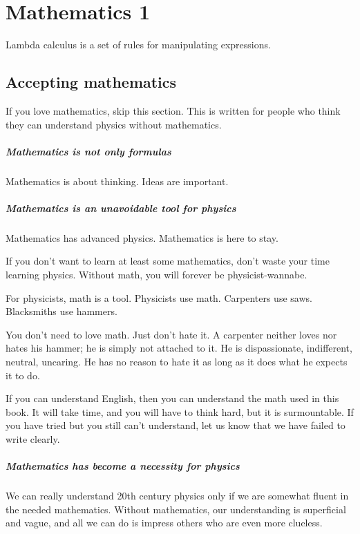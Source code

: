 \chapter{Mathematics 1}

Lambda calculus is a set of rules for manipulating expressions.

\section*{Accepting mathematics}

If you love mathematics, skip this section.
This is written for people who think
they can understand physics without mathematics.

\paragraph{Mathematics is not only formulas}
Mathematics is about thinking.
Ideas are important.

\paragraph{Mathematics is an unavoidable tool for physics}

Mathematics has advanced physics.
Mathematics is here to stay.

If you don't want to learn at least some mathematics,
don't waste your time learning physics.
Without math, you will forever be physicist-wannabe.

For physicists, math is a tool.
Physicists use math.
Carpenters use saws.
Blacksmiths use hammers.

You don't need to love math.
Just don't hate it.
A carpenter neither loves nor hates his hammer;
he is simply not attached to it.
He is dispassionate, indifferent, neutral, uncaring.
He has no reason to hate it as long as it does what he expects it to do.

If you can understand English,
then you can understand the math used in this book.
It will take time, and you will have to think hard, but it is surmountable.
If you have tried but you still can't understand,
let us know that we have failed to write clearly.

\paragraph{Mathematics has become a necessity for physics}

We can really understand 20th century physics only if
we are somewhat fluent in the needed mathematics.
Without mathematics, our understanding is superficial and vague,
and all we can do is impress others who are even more clueless.

